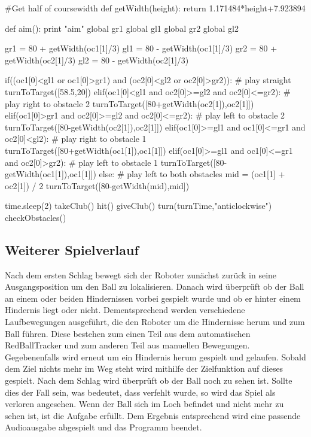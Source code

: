 \documentclass{scrartcl}
\begin{document}
\begin{python}
#Get half of coursewidth
def getWidth(height):
    return 1.171484*height+7.923894 

def aim():
    print "aim"
    global gr1
    global gl1
    global gr2
    global gl2

    gr1 = 80 + getWidth(oc1[1]/3)
    gl1 = 80 - getWidth(oc1[1]/3)
    gr2 = 80 + getWidth(oc2[1]/3)
    gl2 = 80 - getWidth(oc2[1]/3)

    if((oc1[0]<gl1 or oc1[0]>gr1) and 
    	(oc2[0]<gl2 or oc2[0]>gr2)):
           # play straight
           turnToTarget([58.5,20])
    elif(oc1[0]<gl1 and oc2[0]>=gl2 and oc2[0]<=gr2):
           # play right to obstacle 2
           turnToTarget([80+getWidth(oc2[1]),oc2[1]])
    elif(oc1[0]>gr1 and oc2[0]>=gl2 and oc2[0]<=gr2):
           # play left to obstacle 2
           turnToTarget([80-getWidth(oc2[1]),oc2[1]])
    elif(oc1[0]>=gl1 and oc1[0]<=gr1 and oc2[0]<gl2):
           # play right to obstacle 1
           turnToTarget([80+getWidth(oc1[1]),oc1[1]])
    elif(oc1[0]>=gl1 and oc1[0]<=gr1 and oc2[0]>gr2):
           # play left to obstacle 1
           turnToTarget([80-getWidth(oc1[1]),oc1[1]])
    else:
           # play left to both obstacles
           mid = (oc1[1] + oc2[1]) / 2
           turnToTarget([80-getWidth(mid),mid])

    time.sleep(2)
    takeClub()
    hit()
    giveClub()
    turn(turnTime,"anticlockwise")
    checkObstacles()

\end{python}

\subsection{Weiterer Spielverlauf}

Nach dem ersten Schlag bewegt sich der Roboter zunächst zurück in seine Ausgangsposition um den Ball zu lokalisieren. Danach wird überprüft ob der Ball an einem oder beiden Hindernissen vorbei gespielt wurde und ob er hinter einem Hindernis liegt oder nicht. Dementsprechend werden verschiedene Laufbewegungen ausgeführt, die den Roboter um die Hindernisse herum und zum Ball führen. Diese bestehen zum einen Teil aus dem automatischen RedBallTracker und zum anderen Teil aus manuellen Bewegungen. Gegebenenfalls wird erneut um ein Hindernis herum gespielt und gelaufen. Sobald dem Ziel nichts mehr im Weg steht wird mithilfe der Zielfunktion auf dieses gespielt. Nach dem Schlag wird überprüft ob der Ball noch zu sehen ist. Sollte dies der Fall sein, was bedeutet, dass verfehlt wurde, so wird das Spiel als verloren angesehen. Wenn der Ball sich im Loch befindet und nicht mehr zu sehen ist, ist die Aufgabe erfüllt. Dem Ergebnis entsprechend wird eine passende Audioausgabe abgespielt und das Programm beendet.  
\end{document}
